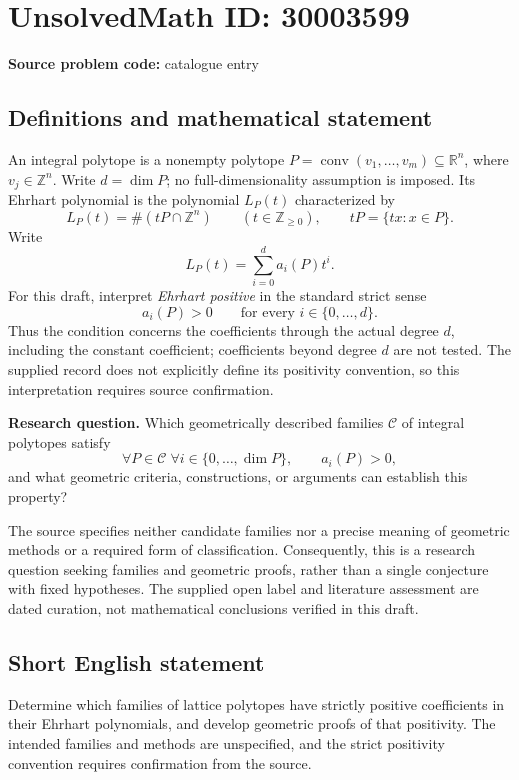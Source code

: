 \documentclass[11pt]{article}
\newcommand{\Z}{\mathbb{Z}}
\newcommand{\R}{\mathbb{R}}
\begin{document}
\section*{UnsolvedMath ID: 30003599}
\textbf{Source problem code:} catalogue entry
\subsection{Definitions and mathematical statement}
An integral polytope is a nonempty polytope \(P=\operatorname{conv}(v_1,\ldots,v_m)\subseteq\R^n\), where \(v_j\in\Z^n\). Write \(d=\dim P\); no full-dimensionality assumption is imposed. Its Ehrhart polynomial is the polynomial \(L_P(t)\) characterized by
\[
L_P(t)=\#(tP\cap\Z^n)\qquad(t\in\Z_{\geq 0}),
\qquad tP=\{tx:x\in P\}.
\]
Write
\[
L_P(t)=\sum_{i=0}^{d}a_i(P)t^i.
\]
For this draft, interpret \emph{Ehrhart positive} in the standard strict sense
\[
a_i(P)>0\qquad\text{for every }i\in\{0,\ldots,d\}.
\]
Thus the condition concerns the coefficients through the actual degree \(d\), including the constant coefficient; coefficients beyond degree \(d\) are not tested. The supplied record does not explicitly define its positivity convention, so this interpretation requires source confirmation.

\textbf{Research question.} Which geometrically described families \(\mathcal C\) of integral polytopes satisfy
\[
\forall P\in\mathcal C\;\forall i\in\{0,\ldots,\dim P\},\qquad a_i(P)>0,
\]
and what geometric criteria, constructions, or arguments can establish this property?

The source specifies neither candidate families nor a precise meaning of geometric methods or a required form of classification. Consequently, this is a research question seeking families and geometric proofs, rather than a single conjecture with fixed hypotheses. The supplied open label and literature assessment are dated curation, not mathematical conclusions verified in this draft.
\subsection{Short English statement}
Determine which families of lattice polytopes have strictly positive coefficients in their Ehrhart polynomials, and develop geometric proofs of that positivity. The intended families and methods are unspecified, and the strict positivity convention requires confirmation from the source.
\end{document}
